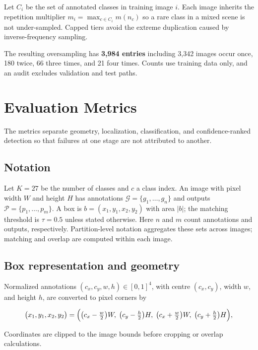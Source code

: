 \documentclass[a4paper,8pt]{article}
\begin{document}
Let $C_i$ be the set of annotated classes in training image $i$. Each image inherits the
repetition multiplier $m_i=\max_{c\in C_i}m(n_c)$ so a rare class in a mixed scene is not
under-sampled. Capped tiers avoid the extreme duplication caused by inverse-frequency sampling.

The resulting oversampling has \textbf{3,984 entries} including 3,342 images occur once, 180 twice, 66 three
times, and 21 four times. Counts use training data only, and an audit excludes validation and
test paths.

\section{Evaluation Metrics}
\label{sec:metrics}

The metrics separate geometry, localization, classification, and confidence-ranked detection so
that failures at one stage are not attributed to another.

\subsection{Notation}

Let $K=27$ be the number of classes and $c$ a class index. An image with pixel width $W$
and height $H$ has annotations
$\mathcal{G}=\{g_1,\dots,g_n\}$ and outputs $\mathcal{P}=\{p_1,\dots,p_m\}$. A box is
$b=(x_1,y_1,x_2,y_2)$ with area $|b|$; the matching threshold is $\tau=0.5$ unless stated
otherwise. Here $n$ and $m$ count annotations and outputs, respectively. Partition-level
notation aggregates these sets across images; matching and overlap are computed within each image.

\subsection{Box representation and geometry}

Normalized annotations $(c_x,c_y,w,h)\in[0,1]^4$, with centre $(c_x,c_y)$, width $w$,
and height $h$, are converted to pixel corners by

\begin{equation}
\bigl(x_1, y_1, x_2, y_2\bigr) =
\Bigl(\bigl(c_x - \tfrac{w}{2}\bigr) W,\;
      \bigl(c_y - \tfrac{h}{2}\bigr) H,\;
      \bigl(c_x + \tfrac{w}{2}\bigr) W,\;
      \bigl(c_y + \tfrac{h}{2}\bigr) H\Bigr),
\label{eq:yolo2xyxy}
\end{equation}

Coordinates are clipped to the image bounds before cropping or overlap calculations.
\end{document}
